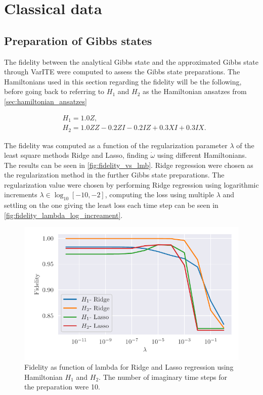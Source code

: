 \documentclass[../main.tex]{subfiles}
\begin{document}
\chapter{Classical data}
\label{sec:seventh}

\section{Preparation of Gibbs states}
The fidelity between the analytical Gibbs state and the approximated Gibbs state through VarITE were computed to assess the Gibbs state preparations. The Hamiltonians used in this section regarding the fidelity will be the following, before going back to referring to $H_1$ and $H_2$ as the Hamiltonian ansatzes from \autoref{sec:hamiltonian_ansatzes}

\begin{equation*}
\begin{aligned}
&H_{1}=1.0 Z, \\
&H_{2}=1.0 Z Z-0.2 Z I-0.2 I Z+0.3 X I+0.3 I X.
\end{aligned}
\end{equation*}

The fidelity was computed as a function of the regularization parameter $\lambda$ of the least square methods Ridge and Lasso, finding $\Dot{\omega}$ using different Hamiltonians. The results can be seen in \autoref{fig:fidelity_vs_lmb}. Ridge regression were chosen as the regularization method in the further Gibbs state preparations. The regularization value were chosen by performing Ridge regression using logarithmic increments $\lambda \in \log_{10} [-10,-2]$, computing the loss using multiple $\lambda$ and settling on the one giving the least loss each time step can be seen in \autoref{fig:fidelity_lambda_log_increament}.

\begin{figure}[h]
    \begin{center}
        \includegraphics{figures/without_rz_ab_new.pdf}
        \caption{Fidelity as function of lambda for Ridge and Lasso regression using Hamiltonian $H_1$ and $H_2$. The number of imaginary time steps for the preparation were 10.}
        \label{fig:fidelity_vs_lmb}
    \end{center}
\end{figure}
\end{document}
